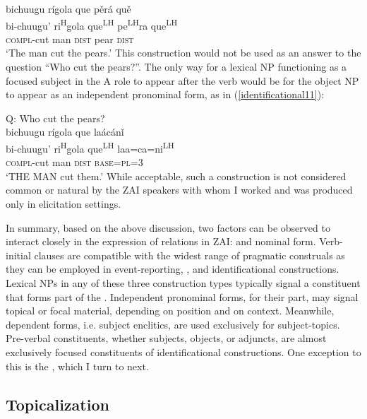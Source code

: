 \ea\label{identificational10} 
\glll bichuugu r\'{i}gola que p\v{e}r\'{a} qu\v{e}  \\
bi-chuugu' ri\textsuperscript{H}gola que\textsuperscript{LH} pe\textsuperscript{LH}ra que\textsuperscript{LH}  \\
\textsc{compl}-cut man \textsc{dist} pear \textsc{dist}  \\
\glt `The man cut the pears.'
\z
This construction would not be used as an answer to the question ``Who cut the pears?''. The only way for a lexical NP functioning as a focused subject in the A role to appear after the verb would be for the object NP to appear as an independent pronominal form, as in (\ref{identificational11}):

\newpage
\ea\label{identificational11}  
{Q: Who cut the pears?} \\
\glll bichuugu r\'{i}gola que la\'{a}c\'{a}n\v{i}  \\
bi-chuugu' ri\textsuperscript{H}gola que\textsuperscript{LH} laa=ca=ni\textsuperscript{LH}  \\
\textsc{compl}-cut man \textsc{dist} \textsc{base}=\textsc{pl}=\textsc{3}  \\
\glt `THE MAN cut them.'
\z
While acceptable, such a construction is not considered common or natural by the ZAI speakers with whom I worked and was produced only in elicitation settings.

In summary, based on the above discussion, two factors can be observed to interact closely in the expression of  relations in ZAI:  and nominal form. Verb-initial clauses are compatible with the widest range of pragmatic construals as they can be employed in event-reporting, , and identificational constructions. Lexical NPs in any of these three construction types typically signal a constituent that forms part of the . Independent pronominal forms, for their part, may signal topical or focal material, depending on position and on context. Meanwhile, dependent forms, i.e. subject enclitics, are used exclusively for subject-topics. Pre-verbal constituents, whether subjects, objects, or adjuncts, are almost exclusively focused constituents of identificational constructions. One exception to this is the , which I turn to next.


\subsection{Topicalization}\label{topicalizationsection}

